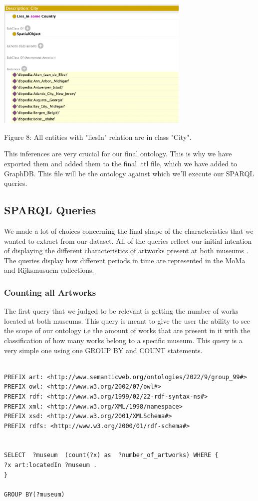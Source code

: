 \documentclass{article}
\begin{document}
\begin{center}
\includegraphics[width=350]{third_inferece.png}
\newline
\caption{Figure 8: All entities with "liesIn" relation are in class "City".}
\end{center}
This inferences are very crucial for our final ontology. This is why we have exported them and added them to
the final .ttl file, which we have added to GraphDB. This file will be the ontology against which we'll execute our SPARQL queries.

\subsection{SPARQL Queries}

We made a lot of choices concerning the final shape of the characteristics that we wanted to extract from our dataset. All of the queries reflect our initial intention of displaying the different characteristics of artworks present at both museums . The queries display how different periods in time are represented in the MoMa and Rijksmusuem collections. 

\subsubsection{Counting all Artworks}
The first query that we judged to be relevant is getting the number of works located at both museums. This query is meant to give the user the ability to see the scope of our ontology i.e the amount of works that are present in it with the classification of how many works belong to a specific museum. This query is a very simple one using one GROUP BY and COUNT statements. 
\begin{verbatim}

PREFIX art: <http://www.semanticweb.org/ontologies/2022/9/group_99#> 
PREFIX owl: <http://www.w3.org/2002/07/owl#> 
PREFIX rdf: <http://www.w3.org/1999/02/22-rdf-syntax-ns#> 
PREFIX xml: <http://www.w3.org/XML/1998/namespace> 
PREFIX xsd: <http://www.w3.org/2001/XMLSchema#> 
PREFIX rdfs: <http://www.w3.org/2000/01/rdf-schema#> 


SELECT  ?museum  (count(?x) as  ?number_of_artworks) WHERE { 
?x art:locatedIn ?museum .
}

GROUP BY(?museum)
\end{verbatim}
\end{document}
